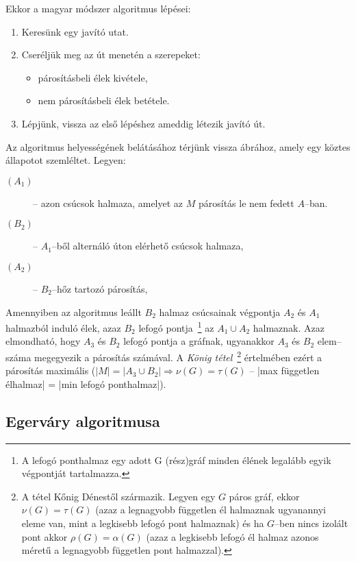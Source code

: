 Ekkor a magyar módszer algoritmus lépései:

\begin{enumerate}
  \item Keresünk egy javító utat.
  \item Cseréljük meg az út menetén a szerepeket:
  	\begin{itemize}
  	\item párosításbeli élek kivétele,
  	\item nem párosításbeli élek betétele. 
	\end{itemize}
  \item Lépjünk, vissza az első lépéshez ameddig létezik javító út.
\end{enumerate}

Az algoritmus helyességének belátásához térjünk vissza  ábrához,
amely egy köztes állapotot szemléltet. Legyen:
\begin{description}
  \item[$(A_1)$] -- azon csúcsok halmaza, amelyet az $M$ párosítás le nem fedett $A$--ban.
  \item[$(B_2)$] -- $A_1$--ből alternáló úton elérhető csúcsok halmaza,
  \item[$(A_2)$] -- $B_2$--hőz tartozó párosítás, 
\end{description}

Amennyiben az algoritmus leállt $B_2$ halmaz csúcsainak végpontja $A_2$ és $A_1$
halmazból induló élek, azaz $B_2$ lefogó pontja~\footnote{A lefogó ponthalmaz egy
adott G (rész)gráf minden élének legalább egyik végpontját tartalmazza.} az $A_1
\cup A_2$ halmaznak. Azaz elmondható, hogy $A_3$ és $B_2$ lefogó pontja a
gráfnak, ugyanakkor $A_3$ és $B_2$ elem--száma megegyezik a párosítás számával.
A \emph{König tétel}~\footnote{ A tétel Kőnig Dénestől származik. Legyen egy $G$
páros gráf, ekkor $\nu(G)=\tau(G)$ (azaz a legnagyobb független él halmaznak
ugyanannyi eleme van, mint a legkisebb lefogó pont halmaznak) és ha $G$--ben
nincs izolált pont akkor $\rho(G)=\alpha(G)$ (azaz a legkisebb lefogó él halmaz
azonos méretű a legnagyobb független pont halmazzal).} értelmében ezért a
párosítás maximális ($ |M|=|A_3 \cup B_2| \Rightarrow \nu(G) = \tau(G)$
-- |max független élhalmaz| = |min lefogó ponthalmaz|).

\subsection{Egerváry algoritmusa}

